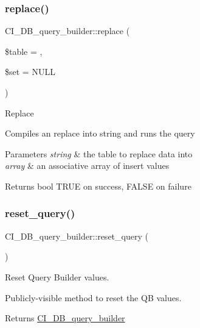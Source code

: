 \subsubsection{\texorpdfstring{replace()}{replace()}}
{\footnotesize\ttfamily C\+I\+\_\+\+D\+B\+\_\+query\+\_\+builder\+::replace (\begin{DoxyParamCaption}\item[{}]{\$table = {\ttfamily \textquotesingle{}\textquotesingle{}},  }\item[{}]{\$set = {\ttfamily NULL} }\end{DoxyParamCaption})}

Replace

Compiles an replace into string and runs the query


\begin{DoxyParams}{Parameters}
{\em string} & the table to replace data into \\
\hline
{\em array} & an associative array of insert values \\
\hline
\end{DoxyParams}
\begin{DoxyReturn}{Returns}
bool T\+R\+UE on success, F\+A\+L\+SE on failure 
\end{DoxyReturn}
\mbox{\label{class_c_i___d_b__query__builder_a1a11e78dde602608558159c3d1c6d9ff}} 
\subsubsection{\texorpdfstring{reset\+\_\+query()}{reset\_query()}}
{\footnotesize\ttfamily C\+I\+\_\+\+D\+B\+\_\+query\+\_\+builder\+::reset\+\_\+query (\begin{DoxyParamCaption}{ }\end{DoxyParamCaption})}

Reset Query Builder values.

Publicly-\/visible method to reset the QB values.

\begin{DoxyReturn}{Returns}
\mbox{\hyperlink{class_c_i___d_b__query__builder}{C\+I\+\_\+\+D\+B\+\_\+query\+\_\+builder}} 
\end{DoxyReturn}
\mbox{\label{class_c_i___d_b__query__builder_a5e5a2d539fab07934c3e5c0699d46fef}} 
